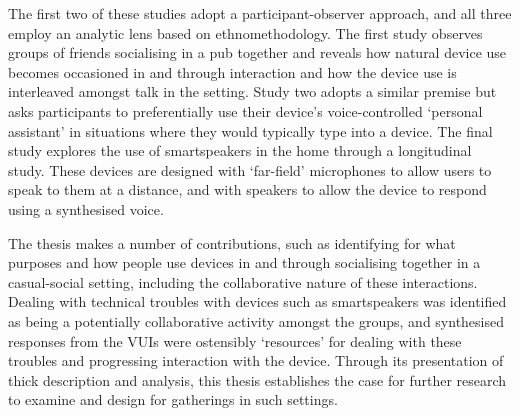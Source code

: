 \crpagebreak{}
The first two of these studies adopt a participant-observer approach, and all three employ an analytic lens based on ethnomethodology.
The first study observes groups of friends socialising in a pub together and reveals how natural device use becomes occasioned in and through interaction and how the device use is interleaved amongst talk in the setting.
Study two adopts a similar premise but asks participants to preferentially use their device's voice-controlled `personal assistant' in situations where they would typically type into a device.
The final study explores the use of smartspeakers in the home through a longitudinal study.
These devices are designed with `far-field' microphones to allow users to speak to them at a distance, and with speakers to allow the device to respond using a synthesised voice.

\begin{revisedsubmission}
The thesis makes a number of contributions, such as identifying for what purposes and how people use devices in and through socialising together in a casual-social setting, including the collaborative nature of these interactions.
Dealing with technical troubles with devices such as smartspeakers was identified as being a potentially collaborative activity amongst the groups, and synthesised responses from the \acp{VUI} were ostensibly `resources' for dealing with these troubles and progressing interaction with the device.
Through its presentation of thick description and analysis, this thesis establishes the case for further research to examine and design for gatherings in such settings.
\end{revisedsubmission}


\endgroup

\vfill


